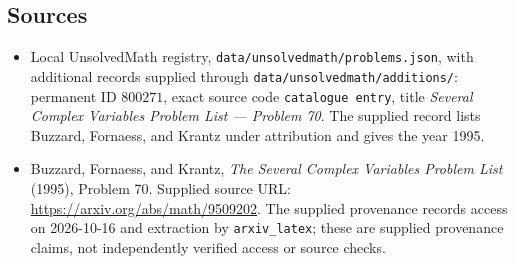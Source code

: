 \documentclass[11pt]{article}
\begin{document}
\subsection{Sources}
\begin{itemize}
\item Local UnsolvedMath registry, \texttt{data/unsolvedmath/problems.json}, with additional records supplied through \texttt{data/unsolvedmath/additions/}: permanent ID \(800271\), exact source code \texttt{catalogue entry}, title \emph{Several Complex Variables Problem List --- Problem 70}. The supplied record lists Buzzard, Fornaess, and Krantz under attribution and gives the year 1995.
\item Buzzard, Fornaess, and Krantz, \emph{The Several Complex Variables Problem List} (1995), Problem 70. Supplied source URL: \url{https://arxiv.org/abs/math/9509202}. The supplied provenance records access on 2026-10-16 and extraction by \texttt{arxiv\_latex}; these are supplied provenance claims, not independently verified access or source checks.
\end{itemize}
\end{document}
